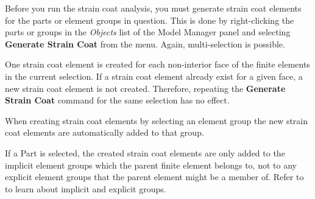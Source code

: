 Before you run the strain coat analysis, you \newline must generate
strain coat elements for the parts \newline or element groups in question.
This is done by \newline right-clicking the parts or groups in the
{\sl Objects} \newline list of the Model Manager panel and selecting \newline
\textbf{Generate Strain Coat} from the menu. \newline
Again, multi-selection is possible.

One strain coat element is created for \newline each non-interior face of the
finite elements \newline in the current selection.
If a strain coat element already exist for a given face,
a new strain coat element is not created.
Therefore, repeating the \textbf{Generate Strain Coat} command for
the same selection has no effect.

When creating strain coat elements by selecting an element group the new
strain coat elements are automatically added to that group.

If a Part is selected, the created strain coat elements are only added to the
implicit element groups which the parent finite element belongs to, not to any
explicit element groups that the parent element might be a member of.
Refer to 
to learn about implicit and explicit groups.





